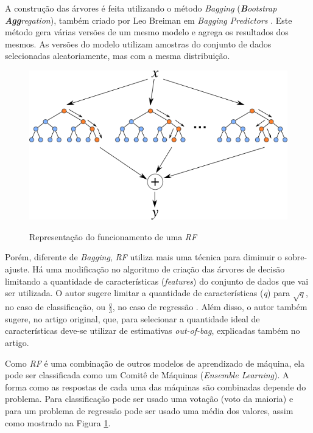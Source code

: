 A construção das árvores é feita utilizando o método \textit{Bagging} (\textit{\textbf{B}ootstrap \textbf{Agg}regation}), também criado por Leo Breiman em \textit{Bagging Predictors} \cite{Breiman:1996:BP:231986.231989}. Este método gera várias versões de um mesmo modelo e agrega os resultados dos mesmos. As versões do modelo utilizam amostras do conjunto de dados selecionadas aleatoriamente, mas com a mesma distribuição.

\begin{figure}[htbp]
    \centering
    \includegraphics[scale=1.0]{monography/img/models/random_forest.png}
    \label{figure:random_forest}
    \caption[Representação do funcionamento de uma \textit{\acrshort{RF}}]{Representação do funcionamento de uma \textit{\acrshort{RF}}\footnotemark}
\end{figure}


Porém, diferente de \textit{Bagging}, \textit{\acrshort{RF}} utiliza mais uma técnica para diminuir o sobre-ajuste. Há uma modificação no algoritmo de criação das árvores de decisão limitando a quantidade de características (\textit{features}) do conjunto de dados que vai ser utilizada. O autor sugere limitar a quantidade de características (\textit{q}) para $ \sqrt{q} $, no caso de classificação, ou $ \frac{q}{3} $, no caso de regressão \cite{hastie2005elements}. Além disso, o autor também sugere, no artigo original, que, para selecionar a quantidade ideal de características deve-se utilizar de estimativas \textit{out-of-bag}, explicadas também no artigo.

Como \textit{\acrshort{RF}} é uma combinação de outros modelos de aprendizado de máquina, ela pode ser classificada como um Comitê de Máquinas (\textit{Ensemble Learning}). A forma como as respostas de cada uma das máquinas são combinadas depende do problema. Para classificação pode ser usado uma votação (voto da maioria) e para um problema de regressão pode ser usado uma média dos valores, assim como mostrado na Figura \ref{figure:random_forest}.

